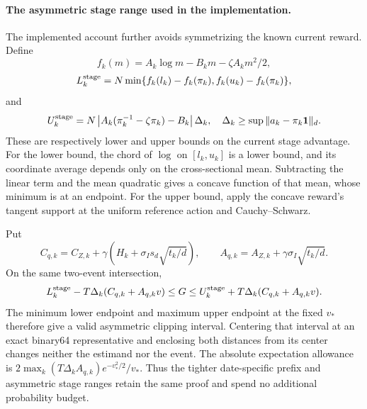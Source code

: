 \paragraph*{The asymmetric stage range used in the implementation.}
The implemented account further avoids symmetrizing the known current
reward. Define
\[
 f_k(m)=A_k\log m-B_k m-\zeta A_km^2/2,
\]
\[
 L_k^{\rm stage}=N\min\{f_k(l_k)-f_k(\pi_k),
                              f_k(u_k)-f_k(\pi_k)\},
\]
and
\[
 U_k^{\rm stage}=N\left|A_k(\pi_k^{-1}-\zeta\pi_k)-B_k\right|\Delta_k,
 \quad \Delta_k\geq\sup\|a_k-\pi_k\bm1\|_d.
\]
These are respectively lower and upper bounds on the current stage
advantage. For the lower bound, the chord of $\log$ on $[l_k,u_k]$
is a lower bound, and its coordinate average depends only on the
cross-sectional mean. Subtracting the linear term and the mean quadratic
gives a concave function of that mean, whose minimum is at an endpoint.
For the upper bound, apply the concave reward's tangent support at the
uniform reference action and Cauchy--Schwarz.

Put
\[
 C_{q,k}=C_{Z,k}+\gamma\left(H_k+\sigma_I s_d\sqrt{t_k/d}\right),
 \qquad A_{q,k}=A_{Z,k}+\gamma\sigma_I\sqrt{t_k/d}.
\]
On the same two-event intersection,
\[
 L_k^{\rm stage}-T\Delta_k(C_{q,k}+A_{q,k}v)
       \leq G\leq
 U_k^{\rm stage}+T\Delta_k(C_{q,k}+A_{q,k}v).
\]
The minimum lower endpoint and maximum upper endpoint at the fixed $v_*$
therefore give a valid asymmetric clipping interval. Centering that interval
at an exact binary64 representative and enclosing both distances from its
center changes neither the estimand nor the event. The absolute expectation
allowance is
$2\max_k(T\Delta_k A_{q,k})e^{-v_*^2/2}/v_*$.
Thus the tighter date-specific prefix and asymmetric stage ranges retain
the same proof and spend no additional probability budget.
